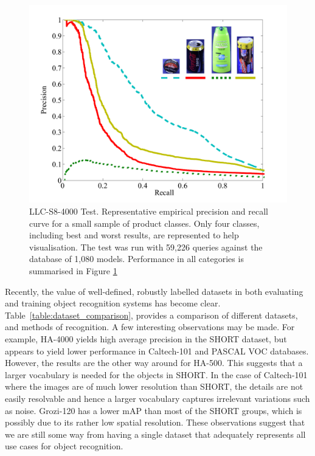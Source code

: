 \begin{figure}[h]
       \centering
		\includegraphics[width=\linewidth]{./gfx/Chapter03/precision-recall.pdf}
        \caption{LLC-S8-4000 Test. Representative empirical precision and recall curve for a small sample of product classes. Only four classes, including best and worst results, are represented to help visualisation. The test was run with 59,226 queries against the database of 1,080 models. Performance in all categories is summarised in Figure \ref{fig:LLC-S8-4000}}
        \label{fig:LLC-S8-4000}
\end{figure}

Recently, the value of well-defined, robustly labelled datasets in both evaluating and training object recognition systems has become clear. Table~\ref{table:dataset_comparison}, provides a comparison of different datasets, and methods of recognition.  A few interesting observations may be made. For example, HA-4000 yields high average precision in the SHORT dataset, but appears to yield lower performance in Caltech-101 and PASCAL VOC databases. However, the results are the other way around for HA-500.  This suggests that a larger vocabulary is needed for the objects in SHORT. In the case of Caltech-101 where the images are of much lower resolution than SHORT, the details are not easily resolvable and hence a larger vocabulary captures irrelevant variations such as noise. Grozi-120 has a lower mAP than most of the SHORT groups, which is possibly due to its rather low spatial resolution. These observations suggest that we are still some way from having a single dataset that adequately represents all use cases for object recognition.


